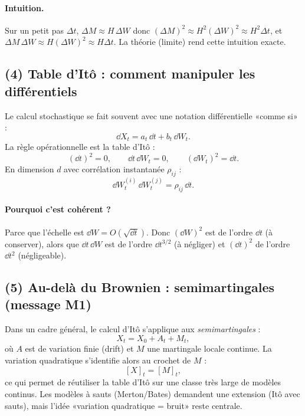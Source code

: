 \paragraph{Intuition.}
Sur un petit pas $\Delta t$, $\Delta M\approx H\,\Delta W$ donc
$(\Delta M)^2\approx H^2(\Delta W)^2\approx H^2\Delta t$,
et $\Delta M\,\Delta W\approx H(\Delta W)^2\approx H\Delta t$.
La théorie (limite) rend cette intuition exacte.

\subsection*{(4) Table d'Itô : comment manipuler les différentiels}
Le calcul stochastique se fait souvent avec une notation différentielle «comme si» :
\[
\dd X_t = a_t\,\dd t + b_t\,\dd W_t.
\]
La règle opérationnelle est la table d'Itô :
\[
(\dd t)^2=0,\qquad \dd t\,\dd W_t=0,\qquad (\dd W_t)^2=\dd t.
\]
En dimension $d$ avec corrélation instantanée $\rho_{ij}$ :
\[
\dd W_t^{(i)}\,\dd W_t^{(j)}=\rho_{ij}\,\dd t.
\]
\paragraph{Pourquoi c'est cohérent ?}
Parce que l'échelle est $\dd W=O(\sqrt{\dd t})$. Donc $(\dd W)^2$ est de l'ordre $\dd t$ (à conserver), alors que $\dd t\,\dd W$ est de l'ordre $\dd t^{3/2}$ (à négliger) et $(\dd t)^2$ de l'ordre $\dd t^2$ (négligeable).

\subsection*{(5) Au-delà du Brownien : semimartingales (message M1)}
Dans un cadre général, le calcul d'Itô s'applique aux \emph{semimartingales} :
\[
X_t=X_0+A_t+M_t,
\]
où $A$ est de variation finie (drift) et $M$ une martingale locale continue.
La variation quadratique s'identifie alors au crochet de $M$ :
\[
[X]_t=[M]_t,
\]
ce qui permet de réutiliser la table d'Itô sur une classe très large de modèles continus.
Les modèles à sauts (Merton/Bates) demandent une extension (Itô avec sauts), mais l'idée «variation quadratique = bruit» reste centrale.
